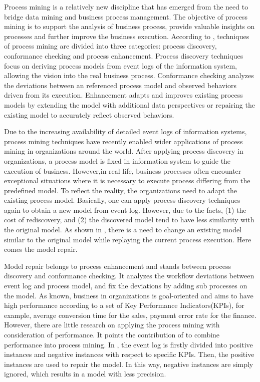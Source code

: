 %
Process mining is a relatively new discipline that has emerged from the need to bridge data mining and business process management. The objective of process mining is to support the analysis of business process, provide valuable insights on processes and further improve the business execution. According to \cite{van2011process}, techniques of process mining are divided into three categories: process discovery, conformance checking and process enhancement. Process discovery techniques focus on deriving process models from event logs of the information system, allowing the vision into the real business process. Conformance checking analyzes the deviations between an referenced process model and observed behaviors driven from its execution. Enhancement adapts and improves existing process models by extending the model with additional data perspectives or repairing the existing model to accurately reflect observed behaviors. 

Due to the increasing availability of detailed event logs of information systems, process mining techniques have recently enabled wider applications of process mining in organizations around the world\cite{van2011process}.  After applying process discovery in organizations, a process model is fixed in information system to guide the execution of business. However,in real life, business processes often encounter exceptional situations where it is necessary to execute process differing from the predefined model. To reflect the reality, the organizations need to adapt the existing process model. Basically, one can apply process discovery techniques again to obtain a new model from event log. However, due to the facts, (1) the cost of rediscovery, and (2)  the discovered model tend to have less similarity with the original model\cite{fahland2012repairing}. As shown in \cite{fahland2012repairing}, there is a need to change an existing model similar to the original model while replaying the current process execution. Here comes the model repair. 

Model repair belongs to process enhancement and stands between process discovery and conformance checking. It analyzes the workflow deviations between event log  and process model, and fix the deviations by adding sub processes on the model. As known, business in organizations is goal-oriented and aims to have high performance according to a set of Key Performance Indicators(KPIs), for example, average conversion time for the sales, payment error rate for the finance. However, there are little research on applying the process mining with consideration of performance\cite{ghasemi2016process}.  It points the contribution of \cite{dees2017enhancing} to combine performance into process mining. In \cite{dees2017enhancing}, the event log is firstly divided into positive instances and negative instances with respect to specific KPIs. Then, the positive instances are used to repair the model. In this way, negative instances are simply ignored, which results in a model with less precision. %


